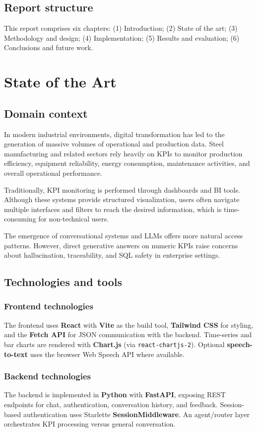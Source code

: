 \documentclass[12pt,a4paper,openany]{report}
\begin{document}
\section{Report structure}
This report comprises six chapters: (1) Introduction; (2) State of the art; (3) Methodology and design; (4) Implementation; (5) Results and evaluation; (6) Conclusions and future work.

\chapter{State of the Art}

\section{Domain context}
In modern industrial environments, digital transformation has led to the generation of massive volumes of operational and production data. Steel manufacturing and related sectors rely heavily on KPIs to monitor production efficiency, equipment reliability, energy consumption, maintenance activities, and overall operational performance.

Traditionally, KPI monitoring is performed through dashboards and BI tools. Although these systems provide structured visualization, users often navigate multiple interfaces and filters to reach the desired information, which is time-consuming for non-technical users.

The emergence of conversational systems and LLMs offers more natural access patterns. However, direct generative answers on numeric KPIs raise concerns about hallucination, traceability, and SQL safety in enterprise settings.

\section{Technologies and tools}
\subsection{Frontend technologies}
The frontend uses \textbf{React} with \textbf{Vite} as the build tool, \textbf{Tailwind CSS} for styling, and the \textbf{Fetch API} for JSON communication with the backend. Time-series and bar charts are rendered with \textbf{Chart.js} (via \texttt{react-chartjs-2}). Optional \textbf{speech-to-text} uses the browser Web Speech API where available.

\subsection{Backend technologies}
The backend is implemented in \textbf{Python} with \textbf{FastAPI}, exposing REST endpoints for chat, authentication, conversation history, and feedback. Session-based authentication uses Starlette \textbf{SessionMiddleware}. An agent/router layer orchestrates KPI processing versus general conversation.
\end{document}
